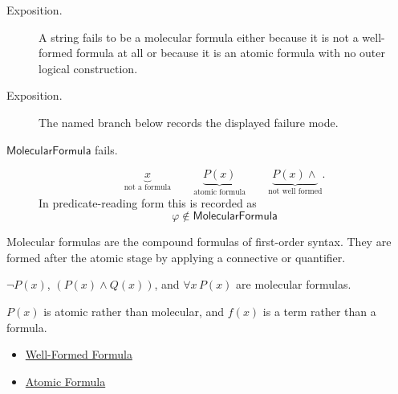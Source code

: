 \begin{remark*}
\begin{description}
  \item[Exposition.] A string fails to be a molecular formula either because it is not a
well-formed formula at all or because it is an atomic formula with no outer
logical construction.
\end{description}
\end{remark*}

\begin{remark*}
\begin{description}
  \item[Exposition.] The named branch below records the displayed failure mode.
\item[\(\mathsf{MolecularFormula}\) fails.] \[
\underbrace{x}_{\text{not a formula}}
\qquad
\underbrace{P(x)}_{\text{atomic formula}}
\qquad
\underbrace{P(x)\land}_{\text{not well formed}}.
\]
  In predicate-reading form this is recorded as
  \[
    \varphi\notin\mathsf{MolecularFormula}
  \]
\end{description}
\end{remark*}

\begin{remark*}[Interpretation]
Molecular formulas are the compound formulas of first-order syntax. They are
formed after the atomic stage by applying a connective or quantifier.
\end{remark*}

\begin{remark*}[Examples]
\(\neg P(x)\), \((P(x)\land Q(x))\), and \(\forall x\,P(x)\) are molecular
formulas.
\end{remark*}

\begin{remark*}
\(P(x)\) is atomic rather than molecular, and \(f(x)\) is a term rather than a
formula.
\end{remark*}

\begin{dependencies}
\begin{itemize}
  \item \hyperref[def:wff-pred]{Well-Formed Formula}
  \item \hyperref[def:atomic-formula]{Atomic Formula}
\end{itemize}
\end{dependencies}
